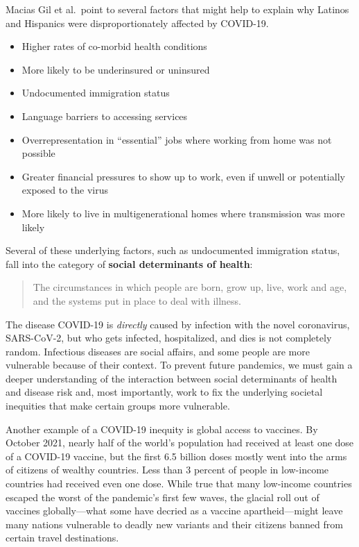 \documentclass[justified,twoside,symmetric,]{tufte-book}
\providecommand{\tightlist}{%
  \setlength{\itemsep}{0pt}\setlength{\parskip}{0pt}}
\renewcommand*{\citep}[1]{{\cite{#1}}}
\begin{document}
Macias Gil et al.~point to several factors that might help to explain why Latinos and Hispanics were disproportionately affected by COVID-19.\citep{macias:2020}

\begin{itemize}
\tightlist
\item
  Higher rates of co-morbid health conditions
\item
  More likely to be underinsured or uninsured
\item
  Undocumented immigration status
\item
  Language barriers to accessing services
\item
  Overrepresentation in ``essential'' jobs where working from home was not possible
\item
  Greater financial pressures to show up to work, even if unwell or potentially exposed to the virus
\item
  More likely to live in multigenerational homes where transmission was more likely
\end{itemize}

Several of these underlying factors, such as undocumented immigration status, fall into the category of \textbf{social determinants of health}:\citep{who:sd}

\begin{quote}
The circumstances in which people are born, grow up, live, work and age, and the systems put in place to deal with illness.
\end{quote}

The disease COVID-19 is \emph{directly} caused by infection with the novel coronavirus, SARS-CoV-2, but who gets infected, hospitalized, and dies is not completely random. Infectious diseases are social affairs, and some people are more vulnerable because of their context. To prevent future pandemics, we must gain a deeper understanding of the interaction between social determinants of health and disease risk and, most importantly, work to fix the underlying societal inequities that make certain groups more vulnerable.

Another example of a COVID-19 inequity is global access to vaccines. By October 2021, nearly half of the world's population had received at least one dose of a COVID-19 vaccine, but the first 6.5 billion doses mostly went into the arms of citizens of wealthy countries. Less than 3 percent of people in low-income countries had received even one dose. While true that many low-income countries escaped the worst of the pandemic's first few waves, the glacial roll out of vaccines globally---what some have decried as a vaccine apartheid---might leave many nations vulnerable to deadly new variants and their citizens banned from certain travel destinations.
\end{document}
